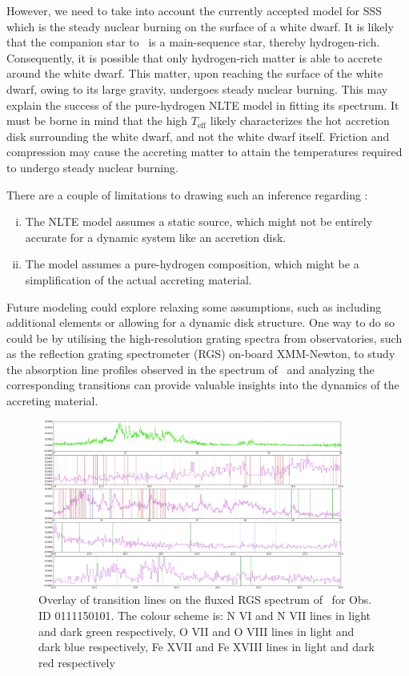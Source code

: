     However, we need to take into account the currently accepted model for SSS which is the steady nuclear burning on the surface of a white dwarf. It is likely that the companion star to \source\ is a main-sequence star, thereby hydrogen-rich. Consequently, it is possible that only hydrogen-rich matter is able to accrete around the white dwarf. This matter, upon reaching the surface of the white dwarf, owing to its large gravity, undergoes steady nuclear burning. This may explain the success of the pure-hydrogen NLTE model in fitting its spectrum. It must be borne in mind that the high $T_\text{eff}$ likely characterizes the hot accretion disk surrounding the white dwarf, and not the white dwarf itself. Friction and compression may cause the accreting matter to attain the temperatures required to undergo steady nuclear burning.
    
    There are a couple of limitations to drawing such an inference regarding \source:
    \begin{enumerate}[i.]
    	\item The NLTE model assumes a static source, which might not be entirely accurate for a dynamic system like an accretion disk.
    	\item The model assumes a pure-hydrogen composition, which might be a simplification of the actual accreting material.
    \end{enumerate}
    
    Future modeling could explore relaxing some assumptions, such as including additional elements or allowing for a dynamic disk structure. One way to do so could be by utilising the high-resolution grating spectra from observatories, such as the reflection grating spectrometer (RGS) on-board XMM-Newton, to study the absorption line profiles observed in the spectrum of \source\ and analyzing the corresponding transitions can provide valuable insights into the dynamics of the accreting material.
    
    \begin{figure}[!htb]
    	\centering
    	\includegraphics[width=0.9\textwidth]{figures/line_identification-rgs.png}
    	\caption{Overlay of transition lines on the fluxed RGS spectrum of \source\ for Obs. ID 0111150101. The colour scheme is: N VI and N VII lines in light and dark green respectively, O VII and O VIII lines in light and dark blue respectively, Fe XVII and Fe XVIII lines in light and dark red respectively}
    	\label{fig:rgs-line-overlay}  
    \end{figure}
    
